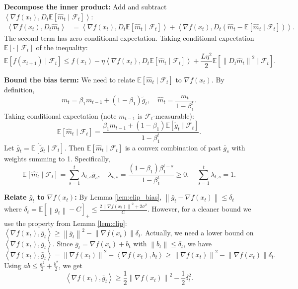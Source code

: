 \documentclass{article}
\newcommand{\E}{\mathbb{E}}
\newcommand{\norm}[1]{\left\| #1 \right\|}
\newcommand{\inner}[2]{\left\langle #1, #2 \right\rangle}
\newcommand{\step}[1]{\text{[Step #1]}}
\begin{document}
\step{3} \textbf{Decompose the inner product:} Add and subtract $\inner{\nabla f(x_t)}{D_t \E[\hat{m}_t \mid \mathcal{F}_t]}$:
\begin{align}
    \inner{\nabla f(x_t)}{D_t \hat{m}_t}
    &= \inner{\nabla f(x_t)}{D_t \E[\hat{m}_t \mid \mathcal{F}_t]} + \inner{\nabla f(x_t)}{D_t (\hat{m}_t - \E[\hat{m}_t \mid \mathcal{F}_t])}.
\end{align}
The second term has zero conditional expectation. Taking conditional expectation $\E[\cdot \mid \mathcal{F}_t]$ of the inequality:
\begin{equation} \label{eq:exp_smooth}
    \E[f(x_{t+1}) \mid \mathcal{F}_t] \le f(x_t) - \eta \inner{\nabla f(x_t)}{D_t \E[\hat{m}_t \mid \mathcal{F}_t]} + \frac{L \eta^2}{2} \E[\norm{D_t \hat{m}_t}^2 \mid \mathcal{F}_t].
\end{equation}

\step{4} \textbf{Bound the bias term:} We need to relate $\E[\hat{m}_t \mid \mathcal{F}_t]$ to $\nabla f(x_t)$. By definition,
\[
    m_t = \beta_1 m_{t-1} + (1-\beta_1) \tilde{g}_t, \quad \hat{m}_t = \frac{m_t}{1-\beta_1^t}.
\]
Taking conditional expectation (note $m_{t-1}$ is $\mathcal{F}_t$-measurable):
\[
    \E[\hat{m}_t \mid \mathcal{F}_t] = \frac{\beta_1 m_{t-1} + (1-\beta_1) \E[\tilde{g}_t \mid \mathcal{F}_t]}{1-\beta_1^t}.
\]
Let $\bar{g}_t = \E[\tilde{g}_t \mid \mathcal{F}_t]$. Then $\E[\hat{m}_t \mid \mathcal{F}_t]$ is a convex combination of past $\bar{g}_s$ with weights summing to 1. Specifically,
\[
    \E[\hat{m}_t \mid \mathcal{F}_t] = \sum_{s=1}^t \lambda_{t,s} \bar{g}_s, \quad \lambda_{t,s} = \frac{(1-\beta_1)\beta_1^{t-s}}{1-\beta_1^t} \ge 0, \quad \sum_{s=1}^t \lambda_{t,s} = 1.
\]

\step{5} \textbf{Relate $\bar{g}_t$ to $\nabla f(x_t)$:} By Lemma \ref{lem:clip_bias}, $\norm{\bar{g}_t - \nabla f(x_t)} \le \delta_t$ where $\delta_t = \E[\norm{g_t}-C]_+ \le \frac{2\norm{\nabla f(x_t)}^2 + 2\sigma^2}{C}$. However, for a cleaner bound we use the property from Lemma \ref{lem:clip}: $\inner{\nabla f(x_t)}{\bar{g}_t} \ge \norm{\bar{g}_t}^2 - \norm{\nabla f(x_t)} \delta_t$. Actually, we need a lower bound on $\inner{\nabla f(x_t)}{\bar{g}_t}$. Since $\bar{g}_t = \nabla f(x_t) + b_t$ with $\norm{b_t} \le \delta_t$, we have
\[
    \inner{\nabla f(x_t)}{\bar{g}_t} = \norm{\nabla f(x_t)}^2 + \inner{\nabla f(x_t)}{b_t} \ge \norm{\nabla f(x_t)}^2 - \norm{\nabla f(x_t)} \delta_t.
\]
Using $ab \le \frac{a^2}{2} + \frac{b^2}{2}$, we get
\[
    \inner{\nabla f(x_t)}{\bar{g}_t} \ge \frac{1}{2} \norm{\nabla f(x_t)}^2 - \frac{1}{2} \delta_t^2.
\]
\end{document}
